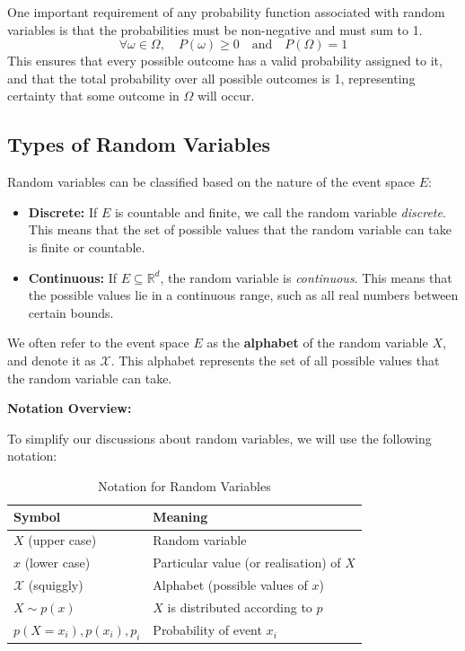 One important requirement of any probability function associated with random variables is that the probabilities must be non-negative and must sum to 1. 
\[
    \forall \omega \in \Omega, \quad P(\omega) \geq 0 \quad \text{and} \quad P(\Omega) = 1
\]
This ensures that every possible outcome has a valid probability assigned to it, and that the total probability over all possible outcomes is 1, representing certainty that some outcome in \(\Omega\) will occur.


\subsection{Types of Random Variables}

Random variables can be classified based on the nature of the event space \(E\):

\begin{itemize}
    \item \textbf{Discrete:} If \(E\) is countable and finite, we call the random variable \textit{discrete}. This means that the set of possible values that the random variable can take is finite or countable.
    \item \textbf{Continuous:} If \(E \subseteq \mathbb{R}^d\), the random variable is \textit{continuous}. This means that the possible values lie in a continuous range, such as all real numbers between certain bounds.
\end{itemize}

We often refer to the event space \(E\) as the \textbf{alphabet} of the random variable \(X\), and denote it as \(\mathcal{X}\). This alphabet represents the set of all possible values that the random variable can take.

\vspace{1em}

\textbf{Notation Overview:}

To simplify our discussions about random variables, we will use the following notation:

\begin{table}[h]
    \centering
    \begin{tabular}{ll}
        \toprule
        \textbf{Symbol} & \textbf{Meaning} \\
        \midrule
        \(X\) (upper case) & Random variable \\
        \(x\) (lower case) & Particular value (or realisation) of \(X\) \\
        \(\mathcal{X}\) (squiggly) & Alphabet (possible values of \(x\)) \\
        \(X \sim p(x)\) & \(X\) is distributed according to \(p\) \\
        \(p(X = x_i), p(x_i), p_i\) & Probability of event \(x_i\) \\
        \bottomrule
    \end{tabular}
    \caption{Notation for Random Variables}
\end{table}

